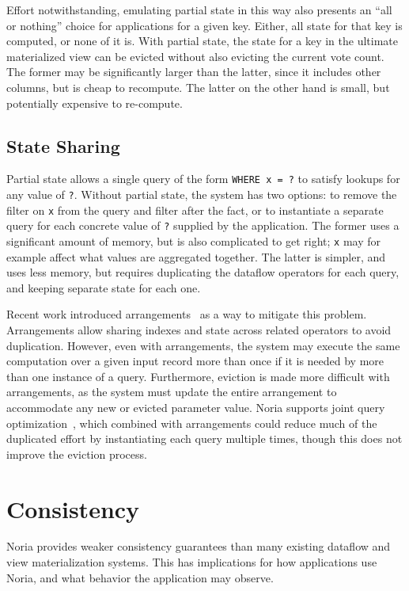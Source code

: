 Effort notwithstanding, emulating partial state in this way also presents an
``all or nothing'' choice for applications for a given key. Either, all state
for that key is computed, or none of it is. With partial state, the state for a
key in the ultimate materialized view can be evicted without also evicting the
current vote count. The former may be significantly larger than the latter,
since it includes other columns, but is cheap to recompute. The latter on the
other hand is small, but potentially expensive to re-compute.

\subsection{State Sharing}

Partial state allows a single query of the form \texttt{WHERE x = ?} to satisfy
lookups for any value of \texttt{?}. Without partial state, the system has two
options: to remove the filter on \texttt{x} from the query and filter after the
fact, or to instantiate a separate query for each concrete value of \texttt{?}
supplied by the application. The former uses a significant amount of memory, but
is also complicated to get right; \texttt{x} may for example affect what values
are aggregated together. The latter is simpler, and uses less memory, but
requires duplicating the dataflow operators for each query, and keeping separate
state for each one.

Recent work introduced arrangements~\cite{arrangements} as a way to mitigate
this problem. Arrangements allow sharing indexes and state across related
operators to avoid duplication. However, even with arrangements, the system may
execute the same computation over a given input record more than once if it is
needed by more than one instance of a query. Furthermore, eviction is made more
difficult with arrangements, as the system must update the entire arrangement to
accommodate any new or evicted parameter value. Noria supports joint query
optimization~\cite{noria}, which combined with arrangements could reduce much of
the duplicated effort by instantiating each query multiple times, though this
does not improve the eviction process.

\section{Consistency}

Noria provides weaker consistency guarantees than many existing dataflow and
view materialization systems. This has implications for how applications use
Noria, and what behavior the application may observe.

